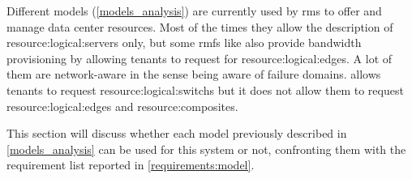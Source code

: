 Different \glspl{model} (\autoref{models_analysis}) are currently used by \glspl{rm} to offer and manage data center resources.
Most of the times they allow the description of \glspl{resource:logical:server} only, but some \glspl{rmf} like \cite{kraken, cloudmirror, oktopus} also provide bandwidth provisioning by allowing tenants to request for \glspl{resource:logical:edge}.
A lot of them are network-aware in the sense being aware of failure domains.
\cite{ontackling} allows tenants to request \glspl{resource:logical:switch} but it does not allow them to request \glspl{resource:logical:edge} and \glspl{resource:composite}.

This section will discuss whether each \gls{model} previously described in \autoref{models_analysis} can be used for this system or not, confronting them with the requirement list reported in \autoref{requirements:model}.